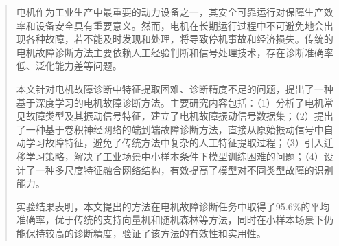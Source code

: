\begin{abstract}
	电机作为工业生产中最重要的动力设备之一，其安全可靠运行对保障生产效率和设备安全具有重要意义。然而，电机在长期运行过程中不可避免地会出现各种故障，若不能及时发现和处理，将导致停机事故和经济损失。传统的电机故障诊断方法主要依赖人工经验判断和信号处理技术，存在诊断准确率低、泛化能力差等问题。

	本文针对电机故障诊断中特征提取困难、诊断精度不足的问题，提出了一种基于深度学习的电机故障诊断方法。主要研究内容包括：（1）分析了电机常见故障类型及其振动信号特征，建立了电机故障振动信号数据集；（2）提出了一种基于卷积神经网络的端到端故障诊断方法，直接从原始振动信号中自动学习故障特征，避免了传统方法中复杂的人工特征提取过程；（3）引入迁移学习策略，解决了工业场景中小样本条件下模型训练困难的问题；（4）设计了一种多尺度特征融合网络结构，有效提高了模型对不同类型故障的识别能力。

	实验结果表明，本文提出的方法在电机故障诊断任务中取得了95.6\%的平均准确率，优于传统的支持向量机和随机森林等方法，同时在小样本场景下仍能保持较高的诊断精度，验证了该方法的有效性和实用性。

\end{abstract}

